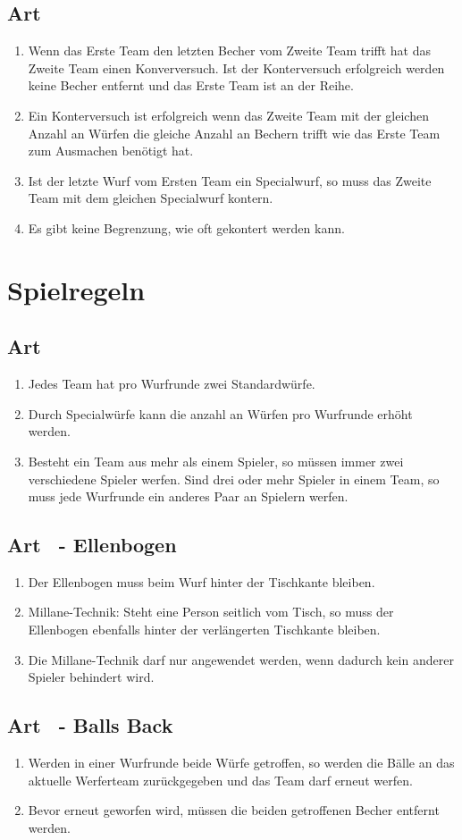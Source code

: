 \documentclass[a4paper,11pt]{scrartcl}
\newcommand{\enum}[1]{\begin{enumerate}[label=(\arabic*)]#1\end{enumerate}}
\newcommand{\art}[2]{\subsection*{#1} \enum{#2}}
\newcommand{\quot}[1]{\glqq #1\grqq}
\newcounter{art}
\begin{document}
    \art{Art \theart}{
        \item
            Wenn das Erste Team den letzten Becher vom Zweite Team trifft hat das Zweite Team einen Konverversuch. Ist der Konterversuch erfolgreich werden keine Becher entfernt und das Erste Team ist an der Reihe.
        \item
            Ein Konterversuch ist erfolgreich wenn das Zweite Team mit der gleichen Anzahl an Würfen die gleiche Anzahl an Bechern trifft wie das Erste Team zum Ausmachen benötigt hat.
        \item
            Ist der letzte Wurf vom Ersten Team ein Specialwurf, so muss das Zweite Team mit dem gleichen Specialwurf kontern.
        \item
            Es gibt keine Begrenzung, wie oft gekontert werden kann.
    }

\section{Spielregeln}
    \art{Art \theart}{
        \item
            Jedes Team hat pro Wurfrunde zwei Standardwürfe.
        \item
            Durch Specialwürfe kann die anzahl an Würfen pro Wurfrunde erhöht werden.
        \item
            Besteht ein Team aus mehr als einem Spieler, so müssen immer zwei verschiedene Spieler werfen. Sind drei oder mehr Spieler in einem Team, so muss jede Wurfrunde ein anderes Paar an Spielern werfen.
    }

    \art{Art \theart\ - Ellenbogen}{
        \item
            Der Ellenbogen muss beim Wurf hinter der Tischkante bleiben.
        \item
            Millane-Technik: Steht eine Person seitlich vom Tisch, so muss der Ellenbogen ebenfalls hinter der verlängerten Tischkante bleiben.
        \item
            Die Millane-Technik darf nur angewendet werden, wenn dadurch kein anderer Spieler behindert wird.
    }

    \art{Art \theart\ - \quot{Balls Back}}{
        \item
            Werden in einer Wurfrunde beide Würfe getroffen, so werden die Bälle an das aktuelle Werferteam zurückgegeben und das Team darf erneut werfen.
        \item
            Bevor erneut geworfen wird, müssen die beiden getroffenen Becher entfernt werden.
    }
\end{document}
